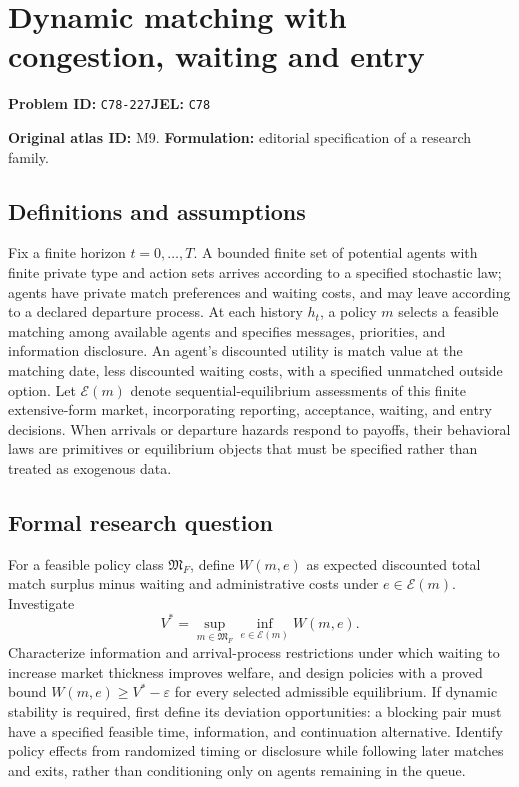 \documentclass[11pt,a4paper]{article}
\begin{document}
\section*{Dynamic matching with congestion, waiting and entry}
\textbf{Problem ID:} \texttt{C78-227}\quad \textbf{JEL:} \texttt{C78}\par
\label{problem:OP-0009}
\label{atlas:prob:M9}

\noindent\textbf{Original atlas ID:} M9. \textbf{Formulation:} editorial specification of a research family.

\subsection*{Definitions and assumptions}

Fix a finite horizon $t=0,\ldots,T$. A bounded finite set of potential agents with finite private type and action sets arrives according to a specified stochastic law; agents have private match preferences and waiting costs, and may leave according to a declared departure process. At each history $h_t$, a policy $m$ selects a feasible matching among available agents and specifies messages, priorities, and information disclosure. An agent's discounted utility is match value at the matching date, less discounted waiting costs, with a specified unmatched outside option. Let $\mathcal E(m)$ denote sequential-equilibrium assessments of this finite extensive-form market, incorporating reporting, acceptance, waiting, and entry decisions. When arrivals or departure hazards respond to payoffs, their behavioral laws are primitives or equilibrium objects that must be specified rather than treated as exogenous data.

\subsection*{Formal research question}

For a feasible policy class $\mathfrak M_F$, define $W(m,e)$ as expected discounted total match surplus minus waiting and administrative costs under $e\in\mathcal E(m)$. Investigate
\[
V^*=\sup_{m\in\mathfrak M_F}\inf_{e\in\mathcal E(m)}W(m,e).
\]
Characterize information and arrival-process restrictions under which waiting to increase market thickness improves welfare, and design policies with a proved bound $W(m,e)\ge V^*-\varepsilon$ for every selected admissible equilibrium. If dynamic stability is required, first define its deviation opportunities: a blocking pair must have a specified feasible time, information, and continuation alternative. Identify policy effects from randomized timing or disclosure while following later matches and exits, rather than conditioning only on agents remaining in the queue.
\end{document}
